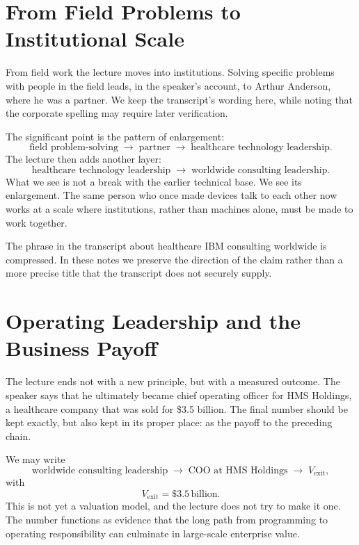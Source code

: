 \section{From Field Problems to Institutional Scale}

From field work the lecture moves into institutions. Solving specific problems with people in the field leads, in the speaker's account, to Arthur Anderson, where he was a partner. We keep the transcript's wording here, while noting that the corporate spelling may require later verification.

The significant point is the pattern of enlargement:
\begin{equation}
\text{field problem-solving}
\;\to\;
\text{partner}
\;\to\;
\text{healthcare technology leadership}.
\end{equation}
The lecture then adds another layer:
\begin{equation}
\text{healthcare technology leadership}
\;\to\;
\text{worldwide consulting leadership}.
\end{equation}
What we see is not a break with the earlier technical base. We see its enlargement. The same person who once made devices talk to each other now works at a scale where institutions, rather than machines alone, must be made to work together.

\begin{remark}
The phrase in the transcript about healthcare IBM consulting worldwide is compressed. In these notes we preserve the direction of the claim rather than a more precise title that the transcript does not securely supply.
\end{remark}

\section{Operating Leadership and the Business Payoff}

The lecture ends not with a new principle, but with a measured outcome. The speaker says that he ultimately became chief operating officer for HMS Holdings, a healthcare company that was sold for \$3.5 billion. The final number should be kept exactly, but also kept in its proper place: as the payoff to the preceding chain.

We may write
\begin{equation}
\text{worldwide consulting leadership}
\;\to\;
\text{COO at HMS Holdings}
\;\to\;
V_{\text{exit}},
\end{equation}
with
\begin{equation}
V_{\text{exit}} = \$3.5\,\text{billion}.
\end{equation}
This is not yet a valuation model, and the lecture does not try to make it one. The number functions as evidence that the long path from programming to operating responsibility can culminate in large-scale enterprise value.

